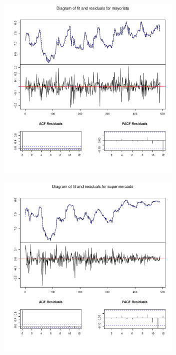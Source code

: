 \documentclass[12pt, twoside]{book}\usepackage[]{graphicx}\usepackage[]{color}
\newenvironment{knitrout}{}{} %
\numberwithin{equation}{section}
\numberwithin{theorem}{section}
\numberwithin{teorema}{section}
\numberwithin{defi}{section}
\numberwithin{prop}{section}
\numberwithin{defi}{section}
\theoremstyle{plain}
\begin{document}
\begin{knitrout}
\color{fgcolor}

{\centering \includegraphics[width=4.5in,height=3.5in]{figure/unnamed-chunk-23-1} 

}




{\centering \includegraphics[width=4.5in,height=3.5in]{figure/unnamed-chunk-23-2} 

}



\end{knitrout}
\end{document}
